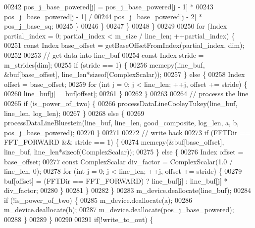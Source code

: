 \begin{DoxyCode}
00242               pos\_j\_base\_powered[j] = pos\_j\_base\_powered[j - 1] *
00243                                       pos\_j\_base\_powered[j - 1] /
00244                                       pos\_j\_base\_powered[j - 2] * pos\_j\_base\_sq;
00245             \}
00246           \}
00247         \}
00248       \}
00249 
00250       \textcolor{keywordflow}{for} (Index partial\_index = 0; partial\_index < m\_size / line\_len; ++partial\_index) \{
00251         \textcolor{keyword}{const} Index base\_offset = getBaseOffsetFromIndex(partial\_index, dim);
00252 
00253         \textcolor{comment}{// get data into line\_buf}
00254         \textcolor{keyword}{const} Index stride = m\_strides[dim];
00255         \textcolor{keywordflow}{if} (stride == 1) \{
00256           memcpy(line\_buf, &buf[base\_offset], line\_len*\textcolor{keyword}{sizeof}(ComplexScalar));
00257         \} \textcolor{keywordflow}{else} \{
00258           Index offset = base\_offset;
00259           \textcolor{keywordflow}{for} (\textcolor{keywordtype}{int} j = 0; j < line\_len; ++j, offset += stride) \{
00260             line\_buf[j] = buf[offset];
00261           \}
00262         \}
00263 
00264         \textcolor{comment}{// processs the line}
00265         \textcolor{keywordflow}{if} (is\_power\_of\_two) \{
00266           processDataLineCooleyTukey(line\_buf, line\_len, log\_len);
00267         \}
00268         \textcolor{keywordflow}{else} \{
00269           processDataLineBluestein(line\_buf, line\_len, good\_composite, log\_len, a, b, pos\_j\_base\_powered);
00270         \}
00271 
00272         \textcolor{comment}{// write back}
00273         \textcolor{keywordflow}{if} (FFTDir == FFT\_FORWARD && stride == 1) \{
00274           memcpy(&buf[base\_offset], line\_buf, line\_len*\textcolor{keyword}{sizeof}(ComplexScalar));
00275         \} \textcolor{keywordflow}{else} \{
00276           Index offset = base\_offset;
00277           \textcolor{keyword}{const} ComplexScalar div\_factor =  ComplexScalar(1.0 / line\_len, 0);
00278           \textcolor{keywordflow}{for} (\textcolor{keywordtype}{int} j = 0; j < line\_len; ++j, offset += stride) \{
00279              buf[offset] = (FFTDir == FFT\_FORWARD) ? line\_buf[j] : line\_buf[j] * div\_factor;
00280           \}
00281         \}
00282       \}
00283       m\_device.deallocate(line\_buf);
00284       \textcolor{keywordflow}{if} (!is\_power\_of\_two) \{
00285         m\_device.deallocate(a);
00286         m\_device.deallocate(b);
00287         m\_device.deallocate(pos\_j\_base\_powered);
00288       \}
00289     \}
00290 
00291     \textcolor{keywordflow}{if}(!write\_to\_out) \{

\end{DoxyCode}
